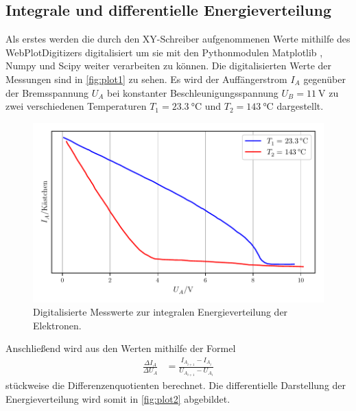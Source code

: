 \subsection{Integrale und differentielle Energieverteilung}
\label{subsec:Energieverteilung}
Als erstes werden die durch den XY-Schreiber aufgenommenen Werte mithilfe des WebPlotDigitizers \cite{Rohatgi2020} digitalisiert um
sie mit den  Pythonmodulen Matplotlib \cite{matplotlib}, Numpy \cite{numpy} und Scipy \cite{scipy} weiter verarbeiten zu können.
Die digitalisierten Werte der Messungen sind in \autoref{fig:plot1} zu sehen. Es wird der Auffängerstrom $I_A$ gegenüber der Bremsspannung
$U_A$ bei konstanter Beschleunigungsspannung $U_B= \qty{11}{\volt}$ zu zwei verschiedenen Temperaturen $T_1= \qty{23.3}{\celsius}$ und 
$T_2= \qty{143}{\celsius}$ dargestellt.
\begin{figure}[H]
  \centering
  \includegraphics[width=\textwidth]{build/plot1.pdf}
  \caption {Digitalisierte Messwerte zur integralen Energieverteilung der Elektronen.}
  \label{fig:plot1}
\end{figure}

Anschließend wird aus den Werten mithilfe der Formel
\begin{align*}
  \frac{\Delta I_A}{\Delta U_A} &= \frac{I_{A_{i+1}}-I_{A_i}}{U_{A_{i+1}}-U_{A_i}}\label{eqn:diffquo}
\end{align*}
stückweise die Differenzenquotienten berechnet.
Die differentielle Darstellung der Energieverteilung wird somit in \autoref{fig:plot2} abgebildet.

